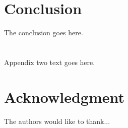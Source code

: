 \documentclass[journal]{IEEEtran}
\begin{document}
\section{Conclusion}
The conclusion goes here.




%


\appendices
\section{}

\section{}
Appendix two text goes here.

\section*{Acknowledgment}

The authors would like to thank...

\ifCLASSOPTIONcaptionsoff
  \newpage
\fi
\end{document}
